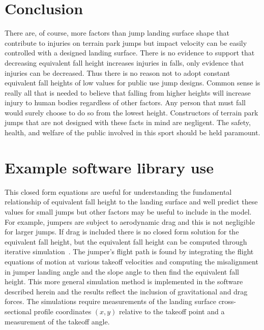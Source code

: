 \documentclass{article}
\begin{document}
\section{Conclusion}
%
There are, of course, more factors than jump landing surface shape that
contribute to injuries on terrain park jumps but impact velocity can be easily
controlled with a designed landing surface. There is no evidence to support
that decreasing equivalent fall height increases injuries in falls, only
evidence that injuries can be decreased. Thus there is no reason not to adopt
constant equivalent fall heights of low values for public use jump designs.
Common sense is really all that is needed to believe that falling from higher
heights will increase injury to human bodies regardless of other factors. Any
person that must fall would surely choose to do so from the lowest height.
Constructors of terrain park jumps that are not designed with these facts in
mind are negligent. The safety, health, and welfare of the public involved in
this sport should be held paramount.





\appendix

\section{Example software library use}
%
This closed form equations are useful for understanding the fundamental
relationship of equivalent fall height to the landing surface and well predict
these values for small jumps but other factors may be useful to include in the
model. For example, jumpers are subject to aerodynamic drag and this is not
negligible for larger jumps. If drag is included there is no closed form
solution for the equivalent fall height, but the equivalent fall height can be
computed through iterative simulation~\cite{Levy2015}. The jumper's flight path
is found by integrating the flight equations of motion at various takeoff
velocities and computing the misalignment in jumper landing angle and the slope
angle to then find the equivalent fall height. This more general simulation
method is implemented in the software described herein and the results reflect
the inclusion of gravitational and drag forces. The simulations require
measurements of the landing surface cross-sectional profile coordinates $(x,y)$
relative to the takeoff point and a measurement of the takeoff angle.
\end{document}

